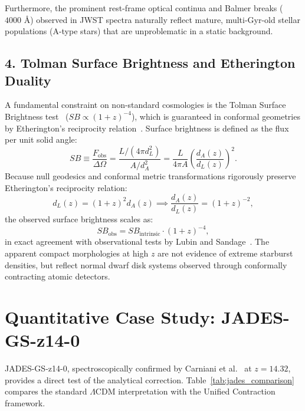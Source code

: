 \documentclass[11pt,a4paper]{article}
\begin{document}
Furthermore, the prominent rest-frame optical continua and Balmer breaks ($4000\text{ \AA}$) observed in JWST spectra naturally reflect mature, multi-Gyr-old stellar populations (A-type stars) that are unproblematic in a static background.

\subsection{4. Tolman Surface Brightness and Etherington Duality}
A fundamental constraint on non-standard cosmologies is the Tolman Surface Brightness test~\cite{tolman1930} ($SB \propto (1+z)^{-4}$), which is guaranteed in conformal geometries by Etherington's reciprocity relation~\cite{etherington1933}. Surface brightness is defined as the flux per unit solid angle:
\begin{equation}
    SB \equiv \frac{F_{\mathrm{obs}}}{\Delta \Omega} = \frac{L / (4\pi d_L^2)}{A / d_A^2} = \frac{L}{4\pi A} \left( \frac{d_A(z)}{d_L(z)} \right)^2.
\end{equation}
Because null geodesics and conformal metric transformations rigorously preserve Etherington's reciprocity relation:
\begin{equation}
    d_L(z) = (1+z)^2 d_A(z) \implies \frac{d_A(z)}{d_L(z)} = (1+z)^{-2},
    \label{eq:etherington}
\end{equation}
the observed surface brightness scales as:
\begin{equation}
    SB_{\mathrm{obs}} = SB_{\mathrm{intrinsic}} \cdot (1+z)^{-4},
    \label{eq:tolman}
\end{equation}
in exact agreement with observational tests by Lubin and Sandage~\cite{lubin2001}. The apparent compact morphologies at high $z$ are not evidence of extreme starburst densities, but reflect normal dwarf disk systems observed through conformally contracting atomic detectors.

\section{Quantitative Case Study: JADES-GS-z14-0}
\label{sec:case_study}

JADES-GS-z14-0, spectroscopically confirmed by Carniani et al.~\cite{carniani2024} at $z = 14.32$, provides a direct test of the analytical correction. Table~\ref{tab:jades_comparison} compares the standard $\Lambda$CDM interpretation with the Unified Contraction framework.
\end{document}
